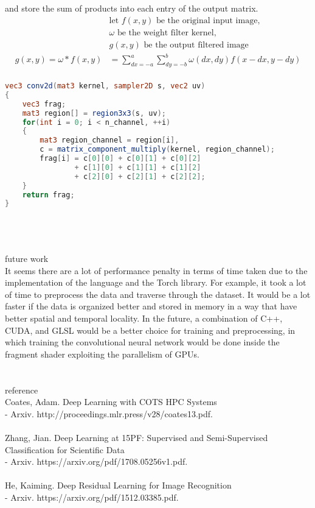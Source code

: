\documentclass[12pt, border = 4pt, multi]{article} %
\begin{document}
and store the sum of products into each entry of the output matrix.
\begin{align*}
&\text{let } f(x, y) \text{ be the original input image},\\
&\omega \text{ be the weight filter kernel},\\
&g(x, y) \text{ be the output filtered image}\\
g(x, y) = \omega * f(x, y) &= \sum_{dx = -a} ^ a \sum_{dy = -b} ^ b \omega (dx, dy) f(x -dx, y - dy)\\
\end{align*}
\begin{lstlisting}[language = glsl]
vec3 conv2d(mat3 kernel, sampler2D s, vec2 uv)
{
    vec3 frag;
    mat3 region[] = region3x3(s, uv);
    for(int i = 0; i < n_channel, ++i)
    {
        mat3 region_channel = region[i],
        c = matrix_component_multiply(kernel, region_channel);
        frag[i] = c[0][0] + c[0][1] + c[0][2]
                + c[1][0] + c[1][1] + c[1][2]
                + c[2][0] + c[2][1] + c[2][2];
    }
    return frag;
}
\end{lstlisting}
\leavevmode
\noindent
\\
\\
\\
future work\\
It seems there are a lot of performance penalty in terms of time taken due to the implementation of the language and the Torch library. For example, it took a lot of time to preprocess the data and traverse through the dataset. It would be a lot faster if the data is organized better and stored in memory in a way that have better spatial and temporal locality. In the future, a combination of C++, CUDA, and GLSL would be a better choice for training and preprocessing, in which training the convolutional neural network would be done inside the fragment shader exploiting the parallelism of GPUs.
\\
\\
\\
reference\\
Coates, Adam. Deep Learning with COTS HPC Systems\\
- Arxiv. http://proceedings.mlr.press/v28/coates13.pdf.\\
\\
Zhang, Jian. Deep Learning at 15PF: Supervised and Semi-Supervised Classification for Scientific Data\\
- Arxiv. https://arxiv.org/pdf/1708.05256v1.pdf.\\
\\
He, Kaiming. Deep Residual Learning for Image Recognition\\
- Arxiv. https://arxiv.org/pdf/1512.03385.pdf.\\
\\
\end{document}
